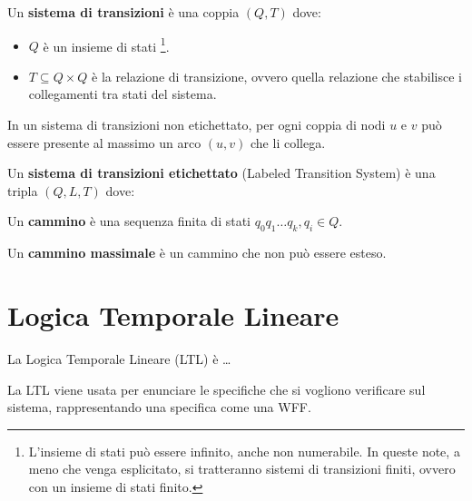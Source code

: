 \begin{defn}
    Un \textbf{sistema di transizioni} è una coppia $(Q, T)$ dove:
    \begin{itemize}
        \item $Q$ è un insieme di stati \footnote[][1cm]{L'insieme di stati
        può essere infinito, anche non numerabile. In queste note, a meno che
        venga esplicitato, si tratteranno sistemi di transizioni finiti,
        ovvero con un insieme di stati finito.}.
        \item $T \subseteq Q \times Q$ è la relazione di transizione, ovvero
        quella relazione che stabilisce i collegamenti tra stati del sistema.
    \end{itemize}
\end{defn}

\begin{rem}
    In un sistema di transizioni non etichettato, per ogni coppia di nodi $u$
    e $v$ può essere presente al massimo un arco $(u, v)$ che li collega.
\end{rem}

\begin{defn}
    Un \textbf{sistema di transizioni etichettato} (Labeled Transition System)
    è una tripla $(Q, L, T)$ dove:
\end{defn}

\begin{defn}
    Un \textbf{cammino} è una sequenza finita di stati
    $q_0 q_1 \ldots q_k, q_i \in Q$.
\end{defn}

\begin{defn}
    Un \textbf{cammino massimale} è un cammino che non può essere esteso.
\end{defn}

\section{Logica Temporale Lineare}
La Logica Temporale Lineare (LTL) è \ldots

La LTL viene usata per enunciare le specifiche che si vogliono verificare
sul sistema, rappresentando una specifica come una WFF.

